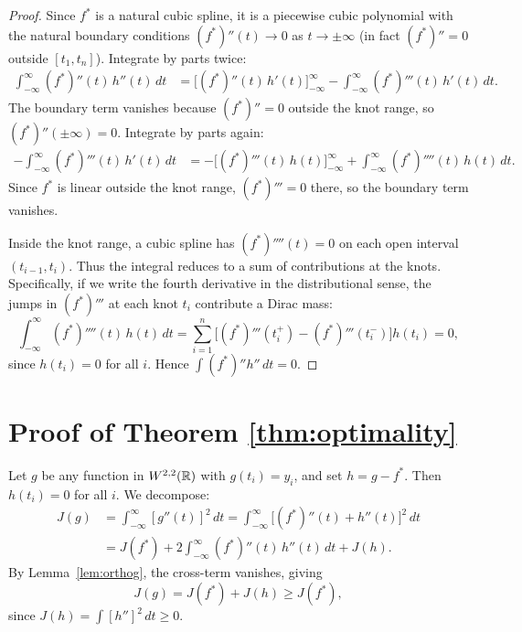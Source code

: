 \begin{proof}
  Since $f^*$ is a natural cubic spline, it is a piecewise cubic
  polynomial with the natural boundary conditions
  $(f^*)''(t) \to 0$ as $t\to\pm\infty$
  (in fact $(f^*)'' = 0$ outside $[t_1, t_n]$).
  Integrate by parts twice:
  \begin{align*}
    \int_{-\infty}^{\infty} (f^*)''(t)\,h''(t)\,dt
    &= \bigl[(f^*)''(t)\,h'(t)\bigr]_{-\infty}^{\infty}
       - \int_{-\infty}^{\infty}(f^*)'''(t)\,h'(t)\,dt.
  \end{align*}
  The boundary term vanishes because $(f^*)'' = 0$ outside the knot
  range, so $(f^*)''(\pm\infty)=0$.  Integrate by parts again:
  \begin{align*}
    -\int_{-\infty}^{\infty}(f^*)'''(t)\,h'(t)\,dt
    &= -\bigl[(f^*)'''(t)\,h(t)\bigr]_{-\infty}^{\infty}
       + \int_{-\infty}^{\infty}(f^*)''''(t)\,h(t)\,dt.
  \end{align*}
  Since $f^*$ is linear outside the knot range, $(f^*)'''=0$ there,
  so the boundary term vanishes.

  Inside the knot range, a cubic spline has $(f^*)''''(t)=0$
  on each open interval $(t_{i-1},t_i)$.  Thus the integral reduces to
  a sum of contributions at the knots.  Specifically, if we write the
  fourth derivative in the distributional sense, the jumps in
  $(f^*)'''$ at each knot $t_i$ contribute a Dirac mass:
  \[
    \int_{-\infty}^{\infty}(f^*)''''(t)\,h(t)\,dt
    = \sum_{i=1}^n \bigl[(f^*)'''(t_i^+) - (f^*)'''(t_i^-)\bigr]h(t_i)
    = 0,
  \]
  since $h(t_i) = 0$ for all $i$.  Hence
  $\int (f^*)'' h'' \,dt = 0$.
\end{proof}

\section*{Proof of Theorem \ref{thm:optimality}}

Let $g$ be any function in $W^{2,2}(\mathbb{R})$ with $g(t_i)=y_i$, and set
$h = g - f^*$.  Then $h(t_i) = 0$ for all $i$.  We decompose:
\begin{align*}
  J(g)
  &= \int_{-\infty}^{\infty} [g''(t)]^2\,dt
   = \int_{-\infty}^{\infty} \bigl[(f^*)''(t) + h''(t)\bigr]^2\,dt \\
  &= J(f^*) + 2\int_{-\infty}^{\infty}(f^*)''(t)\,h''(t)\,dt + J(h).
\end{align*}
By Lemma~\ref{lem:orthog}, the cross-term vanishes, giving
\[
  J(g) = J(f^*) + J(h) \geq J(f^*),
\]
since $J(h) = \int[h'']^2\,dt \geq 0$.

